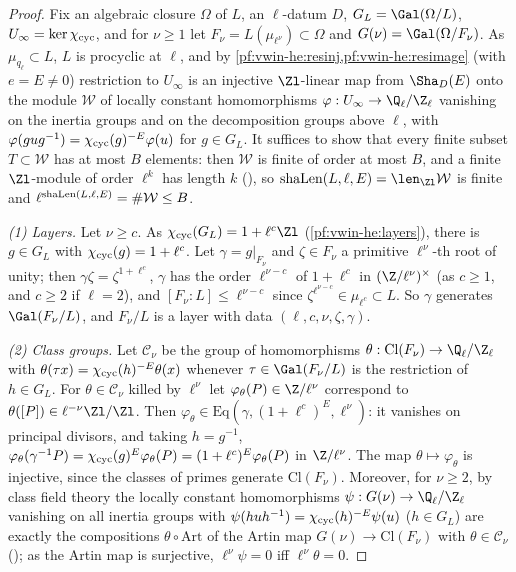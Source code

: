 \begin{proof}
Fix an algebraic closure $\Omega$ of $L$, an $\ell$-datum $D$, $G_L=\Gal(\Omega/L)$, $U_\infty=\ker\chi_{\mathrm{cyc}}$, and for $\nu\ge1$ let
$F_\nu=L(\mu_{\ell^\nu})\subset\Omega$ and $G(\nu)=\Gal(\Omega/F_\nu)$. As $\mu_{q_\ell}\subset L$, $L$ is procyclic at $\ell$, and by
\cref{pf:vwin-he:resinj,pf:vwin-he:resimage} (with $e=E\ne0$) restriction to $U_\infty$ is an injective $\Zl$-linear map from
$\Sha_D(E)$ onto the module $\mathcal W$ of locally constant homomorphisms $\varphi:U_\infty\to\vwinQZ$ vanishing on the inertia groups
and on the decomposition groups above $\ell$, with $\varphi(gug^{-1})=\chi_{\mathrm{cyc}}(g)^{-E}\varphi(u)$ for $g\in G_L$. It suffices to show that
every finite subset $T\subset\mathcal W$ has at most $B$ elements: then $\mathcal W$ is finite of order at most $B$, and a finite
$\Zl$-module of order $\ell^k$ has length $k$ (), so $\vwinsh(L,\ell,E)=\len_{\Zl}\mathcal W$ is
finite and $\ell^{\mathrm{shaLen}(L,\ell,E)}=\#\mathcal W\le B$.

\emph{(1) Layers.} Let $\nu\ge c$. As $\vwincyc(G_L)=1+\ell^c\Zl$ (\cref{pf:vwin-he:layers}), there is $g\in G_L$ with
$\chi_{\mathrm{cyc}}(g)=1+\ell^c$. Let $\gamma=g|_{F_\nu}$ and $\zeta\in F_\nu$ a primitive $\ell^\nu$-th root of unity; then
$\gamma\zeta=\zeta^{1+\ell^c}$, $\gamma$ has the order $\ell^{\nu-c}$ of $1+\ell^c$ in $(\Z/\ell^\nu)^\times$ (as $c\ge1$, and $c\ge2$
if $\ell=2$), and $[F_\nu:L]\le\ell^{\nu-c}$ since $\zeta^{\ell^{\nu-c}}\in\mu_{\ell^c}\subset L$. So $\gamma$ generates
$\Gal(F_\nu/L)$, and $F_\nu/L$ is a layer with data $(\ell,c,\nu,\zeta,\gamma)$.

\emph{(2) Class groups.} Let $\mathcal C_\nu$ be the group of homomorphisms $\theta:\mathrm{Cl}(F_\nu)\to\vwinQZ$ with
$\theta(\tau x)=\chi_{\mathrm{cyc}}(h)^{-E}\theta(x)$ whenever $\tau\in\Gal(F_\nu/L)$ is the restriction of $h\in G_L$. For $\theta\in\mathcal C_\nu$
killed by $\ell^\nu$ let $\varphi_\theta(P)\in\Z/\ell^\nu$ correspond to $\theta([P])\in\ell^{-\nu}\Zl/\Zl$. Then
$\varphi_\theta\in\mathrm{Eq}(\gamma,(1+\ell^c)^E,\ell^\nu)$: it vanishes on principal divisors, and taking $h=g^{-1}$,
$\varphi_\theta(\gamma^{-1}P)=\chi_{\mathrm{cyc}}(g)^E\varphi_\theta(P)=(1+\ell^c)^E\varphi_\theta(P)$ in $\Z/\ell^\nu$. The map $\theta\mapsto\varphi_\theta$ is
injective, since the classes of primes generate $\mathrm{Cl}(F_\nu)$. Moreover, for $\nu\ge2$, by class field theory the locally
constant homomorphisms $\psi:G(\nu)\to\vwinQZ$ vanishing on all inertia groups with $\psi(huh^{-1})=\chi_{\mathrm{cyc}}(h)^{-E}\psi(u)$ ($h\in G_L$)
are exactly the compositions $\theta\circ\mathrm{Art}$ of the Artin map $G(\nu)\to\mathrm{Cl}(F_\nu)$ with $\theta\in\mathcal C_\nu$
(); as the Artin map is surjective, $\ell^\nu\psi=0$ iff $\ell^\nu\theta=0$.


\end{proof}
